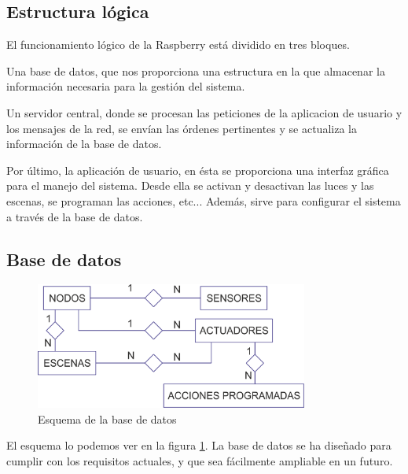 \subsection{Estructura lógica}

El funcionamiento lógico de la Raspberry está dividido en tres bloques. 

Una base de datos, que nos proporciona una estructura en la que almacenar la información necesaria para la gestión del sistema. 


Un servidor central, donde se procesan las peticiones de la aplicacion de usuario y los mensajes de la red, se envían las órdenes pertinentes y se actualiza la información de la base de datos.

Por último, la aplicación de usuario, en ésta se proporciona una interfaz gráfica para el manejo del sistema. Desde ella se activan y desactivan las luces y las escenas, se programan las acciones, etc... Además, sirve para configurar el sistema a través de la base de datos.

\subsection{Base de datos}
\begin{figure}[htbp]
    \centering
    \includegraphics[width=0.80\textwidth]{imagenes/esquema_bd.png}
    \caption{Esquema de la base de datos}
    \label{fig:esquema_bd}
\end{figure}

El esquema lo podemos ver en la figura \ref{fig:esquema_bd}. La base de datos se ha diseñado para cumplir con los requisitos actuales, y que sea fácilmente ampliable en un futuro.



